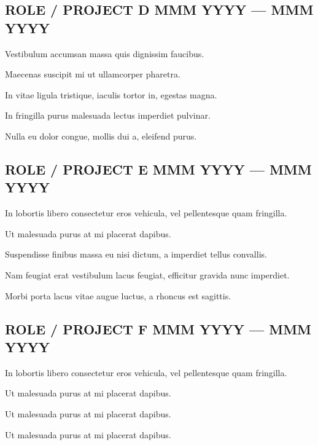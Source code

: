 \subsection{{ROLE / PROJECT D \hfill MMM YYYY --- MMM YYYY}}
\begin{zitemize}
    \item Vestibulum accumsan massa quis dignissim faucibus.
    \item Maecenas suscipit mi ut ullamcorper pharetra.
    \item In vitae ligula tristique, iaculis tortor in, egestas magna.
    \item In fringilla purus malesuada lectus imperdiet pulvinar.
    \item Nulla eu dolor congue, mollis dui a, eleifend purus.
\end{zitemize}

\subsection{{ROLE / PROJECT E \hfill MMM YYYY --- MMM YYYY}}
\begin{zitemize}
    \item In lobortis libero consectetur eros vehicula, vel pellentesque quam fringilla.
    \item Ut malesuada purus at mi placerat dapibus.
    \item Suspendisse finibus massa eu nisi dictum, a imperdiet tellus convallis.
    \item Nam feugiat erat vestibulum lacus feugiat, efficitur gravida nunc imperdiet.
    \item Morbi porta lacus vitae augue luctus, a rhoncus est sagittis.
\end{zitemize}

\subsection{{ROLE / PROJECT F \hfill MMM YYYY --- MMM YYYY}}
\begin{zitemize}
    \item In lobortis libero consectetur eros vehicula, vel pellentesque quam fringilla.
    \item Ut malesuada purus at mi placerat dapibus.
    \item Ut malesuada purus at mi placerat dapibus.
    \item Ut malesuada purus at mi placerat dapibus.
\end{zitemize}

